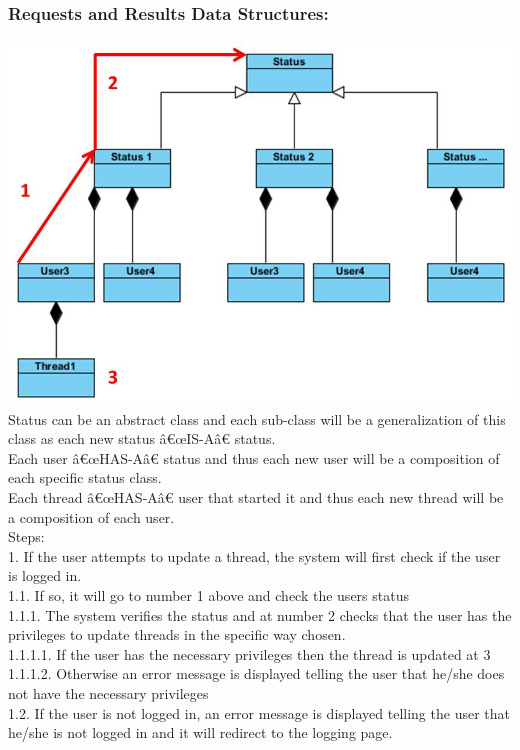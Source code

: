 \documentclass[a4paper,11pt]{article}
\begin{document}
\subsubsection*{Requests and Results Data Structures:}
\includegraphics[width=1\linewidth]{./Images/CRUDThread/Diagrams/9.jpg}\\
Status can be an abstract class and each sub-class will be a generalization of this class as each new status â€œIS-Aâ€ status.\\
Each user â€œHAS-Aâ€ status and thus each new user will be a composition of each specific status class.\\
Each thread â€œHAS-Aâ€ user that started it and thus each new thread will be a composition of each user.\\
Steps:\\
1.	If the user attempts to update a thread, the system will first check if the user is logged in.\\
1.1.	If so, it will go to number 1 above and check the users status\\
1.1.1.	The system verifies the status and at number 2 checks that the user has the privileges to update threads in the specific way chosen.\\
1.1.1.1.	If the user has the necessary privileges then the thread is updated at 3\\
1.1.1.2.	Otherwise an error message is displayed telling the user that he/she does not have the necessary privileges \\
1.2.	If the user is not logged in, an error message is displayed telling the user that he/she is not logged in and it will redirect to the logging page.\\
\end{document}

